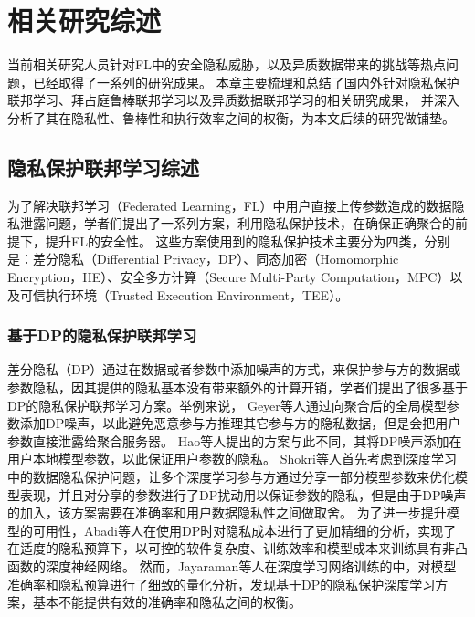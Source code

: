 \chapter{相关研究综述}
\label{chap:main}
当前相关研究人员针对FL中的安全隐私威胁，以及异质数据带来的挑战等热点问题，已经取得了一系列的研究成果。
本章主要梳理和总结了国内外针对隐私保护联邦学习、拜占庭鲁棒联邦学习以及异质数据联邦学习的相关研究成果，
并深入分析了其在隐私性、鲁棒性和执行效率之间的权衡，为本文后续的研究做铺垫。

\section{隐私保护联邦学习综述}
\label{sec:ppfl}
为了解决联邦学习（Federated Learning，FL）中用户直接上传参数造成的数据隐私泄露问题，学者们提出了一系列方案，利用隐私保护技术，在确保正确聚合的前提下，提升FL的安全性。
这些方案使用到的隐私保护技术主要分为四类，分别是：差分隐私（Differential Privacy，DP）\cite{dwork2006differential}、同态加密（Homomorphic Encryption，HE）\cite{gentry2013homomorphic}、安全多方计算（Secure Multi-Party Computation，MPC）\cite{shamir1979share}以及可信执行环境（Trusted Execution Environment，TEE）\cite{sabt2015trusted}。

\subsection{基于DP的隐私保护联邦学习}
差分隐私（DP）通过在数据或者参数中添加噪声的方式，来保护参与方的数据或参数隐私，因其提供的隐私基本没有带来额外的计算开销，学者们提出了很多基于DP的隐私保护联邦学习方案\cite{agarwal2018cpsgd, choudhury2019differential, dubey2020differentially, geyer2017differentially, hao2019efficient, hao2019towards, hu2020personalized, rodriguez2020federated, triastcyn2019federated, wei2020federated}。举例来说，
Geyer等人\cite{geyer2017differentially}通过向聚合后的全局模型参数添加DP噪声，以此避免恶意参与方推理其它参与方的隐私数据，但是会把用户参数直接泄露给聚合服务器。
Hao等人\cite{hao2019efficient}提出的方案与此不同，其将DP噪声添加在用户本地模型参数，以此保证用户参数的隐私。
Shokri等人\cite{shokri2015privacy}首先考虑到深度学习中的数据隐私保护问题，让多个深度学习参与方通过分享一部分模型参数来优化模型表现，并且对分享的参数进行了DP扰动用以保证参数的隐私，但是由于DP噪声的加入，该方案需要在准确率和用户数据隐私性之间做取舍。
为了进一步提升模型的可用性，Abadi等人\cite{abadi2016deep}在使用DP时对隐私成本进行了更加精细的分析，实现了在适度的隐私预算下，以可控的软件复杂度、训练效率和模型成本来训练具有非凸函数的深度神经网络。
然而，Jayaraman等人\cite{jayaraman2019evaluating}在深度学习网络训练的中，对模型准确率和隐私预算进行了细致的量化分析，发现基于DP的隐私保护深度学习方案，基本不能提供有效的准确率和隐私之间的权衡。

